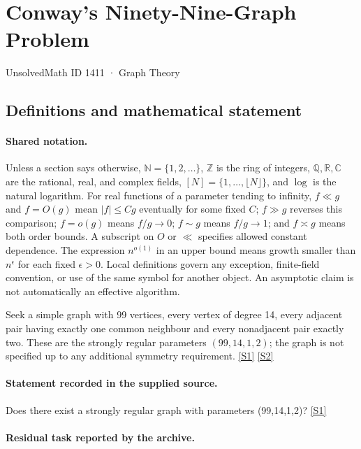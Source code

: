 \documentclass[11pt,a4paper]{article}
\newcommand{\N}{\mathbb{N}}
\newcommand{\Z}{\mathbb{Z}}
\newcommand{\Q}{\mathbb{Q}}
\newcommand{\R}{\mathbb{R}}
\newcommand{\C}{\mathbb{C}}
\newcommand{\sref}[2]{\hyperlink{source:#1:#2}{[S#2]}}
\begin{document}

\setcounter{section}{1410}

\section{Conway’s Ninety-Nine-Graph Problem}\label{1411}

{\small\sffamily UnsolvedMath ID 1411 · Graph Theory}

\subsection{Definitions and mathematical statement}

\paragraph{Shared notation.}Unless a section says otherwise, $\N=\{1,2,\ldots\}$,
$\Z$ is the ring of integers, $\Q,\R,\C$ are the rational, real, and complex
fields, $[N]=\{1,\ldots,\lfloor N\rfloor\}$, and $\log$ is the natural
logarithm. For real functions of a parameter tending to infinity,
$f\ll g$ and $f=O(g)$ mean $|f|\leq Cg$ eventually for some fixed $C$;
$f\gg g$ reverses this comparison; $f=o(g)$ means $f/g\to0$;
$f\sim g$ means $f/g\to1$; and $f\asymp g$ means both order bounds.
A subscript on $O$ or $\ll$ specifies allowed constant dependence.
The expression $n^{o(1)}$ in an upper bound means growth smaller than
$n^\epsilon$ for each fixed $\epsilon>0$. Local definitions govern any
exception, finite-field convention, or use of the same symbol for another
object. An asymptotic claim is not automatically an effective algorithm.



Seek a simple graph with 99 vertices, every vertex of degree 14, every adjacent pair having exactly one common neighbour and every nonadjacent pair exactly two. These are the strongly regular parameters $(99,14,1,2)$; the graph is not specified up to any additional symmetry requirement. \sref{1411}{1} \sref{1411}{2}

\paragraph{Statement recorded in the supplied source.}
Does there exist a strongly regular graph with parameters (99,14,1,2)? \sref{1411}{1}

\paragraph{Residual task reported by the archive.}
\end{document}
